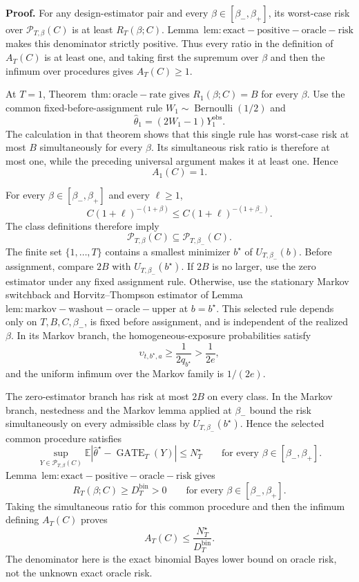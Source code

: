 \textbf{Proof.} For any design-estimator pair and every \(\beta\in[\beta_-,\beta_+]\), its worst-case risk over \(\mathcal P_{T,\beta}(C)\) is at least \(R_T(\beta;C)\). Lemma~\(\mathrm{lem:exact-positive-oracle-risk}\) makes this denominator strictly positive. Thus every ratio in the definition of \(A_T(C)\) is at least one, and taking first the supremum over \(\beta\) and then the infimum over procedures gives \(A_T(C)\ge1\).

At \(T=1\), Theorem~\(\mathrm{thm:oracle-rate}\) gives \(R_1(\beta;C)=B\) for every \(\beta\). Use the common fixed-before-assignment rule \(W_1\sim\operatorname{Bernoulli}(1/2)\) and
\[
\widehat\theta_1=(2W_1-1)Y_1^{\mathrm{obs}}.
\]
The calculation in that theorem shows that this single rule has worst-case risk at most \(B\) simultaneously for every \(\beta\). Its simultaneous risk ratio is therefore at most one, while the preceding universal argument makes it at least one. Hence
\[
A_1(C)=1.
\]

For every \(\beta\in[\beta_-,\beta_+]\) and every \(\ell\ge1\),
\[
C(1+\ell)^{-(1+\beta)}\le C(1+\ell)^{-(1+\beta_-)}.
\]
The class definitions therefore imply
\[
\mathcal P_{T,\beta}(C)\subseteq\mathcal P_{T,\beta_-}(C).
\]
The finite set \(\{1,\ldots,T\}\) contains a smallest minimizer \(b^\star\) of \(U_{T,\beta_-}(b)\). Before assignment, compare \(2B\) with \(U_{T,\beta_-}(b^\star)\). If \(2B\) is no larger, use the zero estimator under any fixed assignment rule. Otherwise, use the stationary Markov switchback and Horvitz--Thompson estimator of Lemma~\(\mathrm{lem:markov-washout-oracle-upper}\) at \(b=b^\star\). This selected rule depends only on \(T,B,C,\beta_-\), is fixed before assignment, and is independent of the realized \(\beta\). In its Markov branch, the homogeneous-exposure probabilities satisfy
\[
\upsilon_{t,b^\star,a}\ge\frac{1}{2q_{b^\star}}>\frac{1}{2e},
\]
and the uniform infimum over the Markov family is \(1/(2e)\).

The zero-estimator branch has risk at most \(2B\) on every class. In the Markov branch, nestedness and the Markov lemma applied at \(\beta_-\) bound the risk simultaneously on every admissible class by \(U_{T,\beta_-}(b^\star)\). Hence the selected common procedure satisfies
\[
\sup_{Y\in\mathcal P_{T,\beta}(C)}
\mathbb E\left|\widehat\theta^\star-\operatorname{GATE}_T(Y)\right|
\le N_T^\star
\qquad\text{for every }\beta\in[\beta_-,\beta_+].
\]
Lemma~\(\mathrm{lem:exact-positive-oracle-risk}\) gives
\[
R_T(\beta;C)\ge D_T^{\mathrm{bin}}>0
\qquad\text{for every }\beta\in[\beta_-,\beta_+].
\]
Taking the simultaneous ratio for this common procedure and then the infimum defining \(A_T(C)\) proves
\[
A_T(C)\le\frac{N_T^\star}{D_T^{\mathrm{bin}}}.
\]
The denominator here is the exact binomial Bayes lower bound on oracle risk, not the unknown exact oracle risk.

